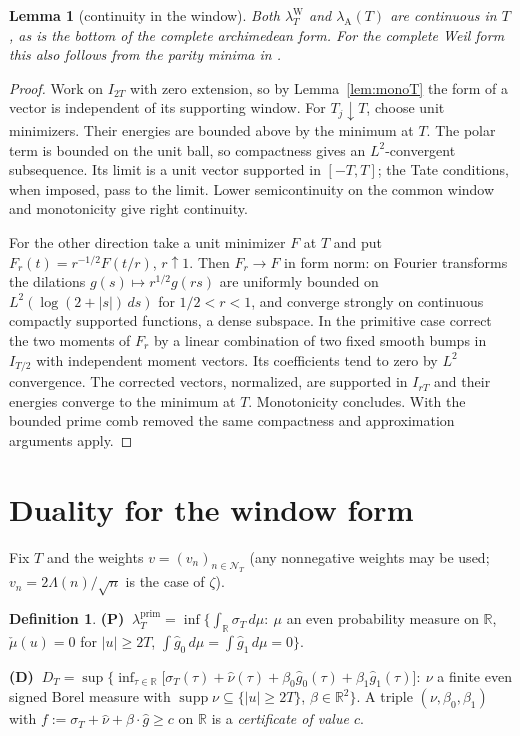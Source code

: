 \documentclass[10pt]{amsart}
\newtheorem{lemma}[theorem]{Lemma}
\theoremstyle{definition}
\newtheorem{definition}[theorem]{Definition}
\theoremstyle{remark}
\newcommand{\R}{\mathbb R}
\newcommand{\supp}{\operatorname{supp}}
\newcommand{\lamP}{\lambda^{\mathrm{prim}}_T}
\newcommand{\lamW}{\lambda^{\mathrm W}_T}
\newcommand{\lamA}{\lambda_{\mathrm A}(T)}
\newcommand{\sT}{\sigma_T}
\newcommand{\gh}[1]{\widehat g_{#1}}
\newcommand{\nuh}{\widehat\nu}
\newcommand{\NT}{\mathcal N_T}
\begin{document}
\begin{lemma}[continuity in the window]\label{lem:contT}\label{lem:contA}
Both $\lamW$ and $\lamA$ are continuous in $T$, as is the bottom
of the complete archimedean form. For the complete Weil form this
also follows from the parity minima in \cite[Thm.~5, p.~199]{Bombieri2000}.
\end{lemma}
\begin{proof}
Work on $I_{2T}$ with zero extension, so by Lemma~\ref{lem:monoT}
the form of a vector is independent of its supporting window.
For $T_j\downarrow T$, choose unit minimizers. Their energies are
bounded above by the minimum at $T$. The polar term is bounded on the
unit ball, so compactness gives an $L^2$-convergent subsequence.
Its limit is a unit vector supported in $[-T,T]$; the Tate conditions,
when imposed, pass to the limit. Lower semicontinuity on the common
window and monotonicity give right continuity.

For the other direction take a unit minimizer $F$ at $T$ and put
$F_r(t)=r^{-1/2}F(t/r)$, $r\uparrow1$. Then $F_r\to F$ in form norm:
on Fourier transforms the dilations $g(s)\mapsto r^{1/2}g(rs)$
are uniformly bounded on $L^2(\log(2+|s|)\,ds)$ for $1/2<r<1$,
and converge strongly on continuous compactly supported functions,
a dense subspace. In the primitive case correct the two moments
of $F_r$ by a linear combination of two fixed smooth bumps in
$I_{T/2}$ with independent moment vectors. Its coefficients tend
to zero by $L^2$ convergence. The corrected vectors, normalized,
are supported in $I_{rT}$ and their energies converge to the minimum
at $T$. Monotonicity concludes. With the bounded prime comb removed
the same compactness and approximation arguments apply.
\end{proof}

\section{Duality for the window form}\label{sec:duality}

Fix $T$ and the weights $v=(v_n)_{n\in\NT}$ (any nonnegative weights may be used; $v_n=2\Lambda(n)/\sqrt n$
is the case of $\zeta$).

\begin{definition}\label{def:PD}
\textbf{(P)} $\ \lamP=\inf\big\{\int_\R\sT\,d\mu:\ \mu$ an even probability measure on $\R$,
$\check\mu(u)=0$ for $|u|\ge2T$, $\int\gh0\,d\mu=\int\gh1\,d\mu=0\big\}$.

\textbf{(D)} $\ D_T=\sup\big\{\inf_{\tau\in\R}\big[\sT(\tau)+\nuh(\tau)+\beta_0\gh0(\tau)+\beta_1\gh1(\tau)\big]:\
\nu$ a finite even signed Borel measure with $\supp\nu\subseteq\{|u|\ge2T\}$, $\beta\in\R^2\big\}$.
A triple $(\nu,\beta_0,\beta_1)$ with $f:=\sT+\nuh+\beta\cdot\widehat g\ge c$ on $\R$ is a
\emph{certificate of value $c$}.
\end{definition}
\end{document}
